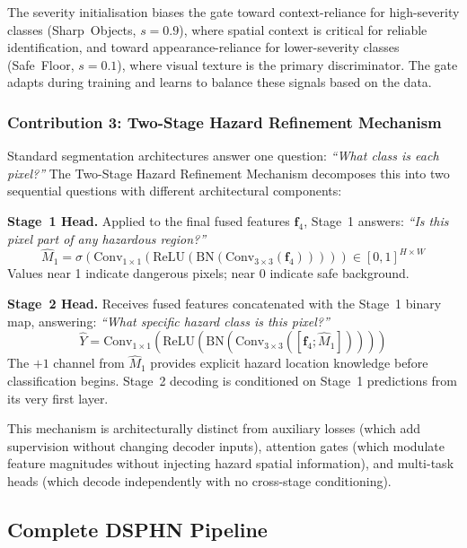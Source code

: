 The severity initialisation biases the gate toward context-reliance
for high-severity classes (Sharp~Objects, $s=0.9$), where spatial
context is critical for reliable identification, and toward
appearance-reliance for lower-severity classes (Safe~Floor, $s=0.1$),
where visual texture is the primary discriminator. The gate adapts
during training and learns to balance these signals based on the data.

\subsubsection{Contribution 3: Two-Stage Hazard Refinement Mechanism}

Standard segmentation architectures answer one question:
\textit{``What class is each pixel?''} The Two-Stage Hazard Refinement
Mechanism decomposes this into two sequential questions with different
architectural components:

\noindent\textbf{Stage~1 Head.}
Applied to the final fused features $\mathbf{f}_4$, Stage~1
answers: \textit{``Is this pixel part of any hazardous region?''}
\begin{equation}
\hat{M}_1 = \sigma\!\left(
    \text{Conv}_{1\times1}(\text{ReLU}(\text{BN}(
    \text{Conv}_{3\times3}(\mathbf{f}_4))))\right)
\in [0,1]^{H \times W}
\label{eq:stage1}
\end{equation}
Values near 1 indicate dangerous pixels; near 0 indicate safe
background.

\noindent\textbf{Stage~2 Head.}
Receives fused features concatenated with the Stage~1 binary map,
answering: \textit{``What specific hazard class is this pixel?''}
\begin{equation}
\hat{Y} = \text{Conv}_{1\times1}(\text{ReLU}(\text{BN}(
    \text{Conv}_{3\times3}([\mathbf{f}_4;\hat{M}_1]))))
\label{eq:stage2}
\end{equation}
The $+1$ channel from $\hat{M}_1$ provides explicit hazard location
knowledge before classification begins. Stage~2 decoding is
conditioned on Stage~1 predictions from its very first layer.

This mechanism is architecturally distinct from auxiliary losses
(which add supervision without changing decoder inputs), attention
gates (which modulate feature magnitudes without injecting hazard
spatial information), and multi-task heads (which decode
independently with no cross-stage conditioning).

\subsection{Complete DSPHN Pipeline}

